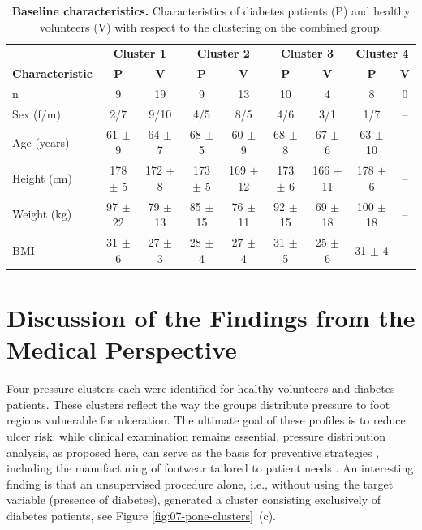 \documentclass[
  oneside]{book}
\begin{document}
\begin{table}

\caption{\label{tab:07-pone-comparison}\textbf{Baseline characteristics.} Characteristics of diabetes patients (P) and healthy volunteers (V) with respect to the clustering on the combined group.}
\centering
\begin{tabular}[t]{lcccccccc}
\toprule
\multicolumn{1}{c}{\textbf{ }} & \multicolumn{2}{c}{\textbf{Cluster 1}} & \multicolumn{2}{c}{\textbf{Cluster 2}} & \multicolumn{2}{c}{\textbf{Cluster 3}} & \multicolumn{2}{c}{\textbf{Cluster 4}} \\
\cmidrule(l{3pt}r{3pt}){2-3} \cmidrule(l{3pt}r{3pt}){4-5} \cmidrule(l{3pt}r{3pt}){6-7} \cmidrule(l{3pt}r{3pt}){8-9}
\textbf{Characteristic} & \textbf{P} & \textbf{V} & \textbf{P} & \textbf{V} & \textbf{P} & \textbf{V} & \textbf{P} & \textbf{V}\\
\midrule
n & 9 & 19 & 9 & 13 & 10 & 4 & 8 & 0\\
Sex (f/m) & 2/7 & 9/10 & 4/5 & 8/5 & 4/6 & 3/1 & 1/7 & --\\
Age (years) & 61 $\pm$ 9 & 64 $\pm$ 7 & 68 $\pm$ 5 & 60 $\pm$ 9 & 68 $\pm$ 8 & 67 $\pm$ 6 & 63 $\pm$ 10 & --\\
Height (cm) & 178 $\pm$ 5 & 172 $\pm$ 8 & 173 $\pm$ 5 & 169 $\pm$ 12 & 173 $\pm$ 6 & 166 $\pm$ 11 & 178 $\pm$ 6 & --\\
Weight (kg) & 97 $\pm$ 22 & 79 $\pm$ 13 & 85 $\pm$ 15 & 76 $\pm$ 11 & 92 $\pm$ 15 & 69 $\pm$ 18 & 100 $\pm$ 18 & --\\
BMI & 31 $\pm$ 6 & 27 $\pm$ 3 & 28 $\pm$ 4 & 27 $\pm$ 4 & 31 $\pm$ 5 & 25 $\pm$ 6 & 31 $\pm$ 4 & --\\
\bottomrule
\end{tabular}
\end{table}

\hypertarget{diabfoot-discussion}{%
\section{Discussion of the Findings from the Medical Perspective}\label{diabfoot-discussion}}

Four pressure clusters each were identified for healthy volunteers and diabetes patients.
These clusters reflect the way the groups distribute pressure to foot regions vulnerable for ulceration.
The ultimate goal of these profiles is to reduce ulcer risk: while clinical examination remains essential, pressure distribution analysis, as proposed here, can serve as the basis for preventive strategies \autocite{BarnEtAl:PLOS15,WaaijmanEtAl:RiskFactorsUlcerRecurrence,Bus:OffloadingDiabeticFoot2012,DeschampsEtAL:KMeansDiabeticFoot2013,DahmenEtAl:TherapeuticFootwear2001,LaveryEtAl:DiabetesCare2003,CavanaghEtAl:OffLoading2010}, including the manufacturing of footwear tailored to patient needs \autocite{BennettsEtAl:Biomechanics2013}.
An interesting finding is that an unsupervised procedure alone, i.e., without using the target variable (presence of diabetes), generated a cluster consisting exclusively of diabetes patients, see Figure \ref{fig:07-pone-clusters}~(c).
\end{document}
